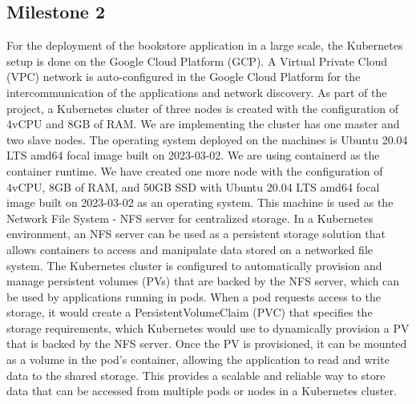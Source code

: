 \subsection{Milestone 2}
For the deployment of the bookstore application in a large scale, the Kubernetes setup is done on the Google Cloud Platform (GCP). A Virtual Private Cloud (VPC) network is auto-configured in the Google Cloud Platform for the intercommunication of the applications and network discovery. As part of the project, a Kubernetes cluster of three nodes is created with the configuration of 4vCPU and 8GB of RAM. We are implementing the cluster has one master and two slave nodes. The operating system deployed on the machines is Ubuntu 20.04 LTS amd64 focal image built on 2023-03-02. We are using containerd as the container runtime. We have created one more node with the configuration of 4vCPU, 8GB of RAM, and 50GB SSD with Ubuntu 20.04 LTS amd64 focal image built on 2023-03-02 as an operating system. This machine is used as the Network File System - NFS server for centralized storage. In a Kubernetes environment, an NFS server can be used as a persistent storage solution that allows containers to access and manipulate data stored on a networked file system. The Kubernetes cluster is configured to automatically provision and manage persistent volumes (PVs) that are backed by the NFS server, which can be used by applications running in pods. When a pod requests access to the storage, it would create a PersistentVolumeClaim (PVC) that specifies the storage requirements, which Kubernetes would use to dynamically provision a PV that is backed by the NFS server. Once the PV is provisioned, it can be mounted as a volume in the pod's container, allowing the application to read and write data to the shared storage. This provides a scalable and reliable way to store data that can be accessed from multiple pods or nodes in a Kubernetes cluster.
